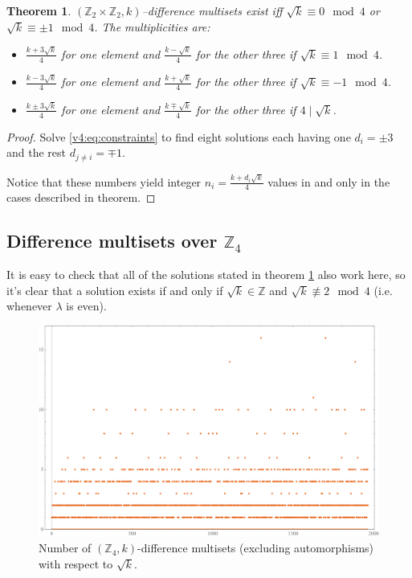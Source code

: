 \documentclass{article}
\theoremstyle{plain}
\newtheorem{theorem}{Theorem}[section]
\theoremstyle{definition}
\theoremstyle{remark}
\begin{document}
            \begin{theorem}
                \label{v4:theorem:z2z2}
                $(\mathbb Z_2 \times \mathbb Z_2, k)$--difference multisets exist iff $\sqrt k \equiv 0 \mod 4$ or $\sqrt k \equiv \pm 1 \mod 4$. The multiplicities are:
                \begin{itemize}
                    \item $\frac{k + 3 \sqrt k}{4}$ for one element and $\frac{k - \sqrt k}{4}$ for the other three if $\sqrt k \equiv 1 \mod 4$.
                    \item $\frac{k - 3 \sqrt k}{4}$ for one element and $\frac{k + \sqrt k}{4}$ for the other three if $\sqrt k \equiv -1 \mod 4$.
                    \item $\frac{k \pm 3 \sqrt k}{4}$ for one element and $\frac{k \mp \sqrt k}{4}$ for the other three if $4 \mid \sqrt k$.
                \end{itemize}
            \end{theorem}
            
            \begin{proof}
                Solve \eqref{v4:eq:constraints} to find eight solutions each having one $d_i = \pm 3$ and the rest $d_{j \neq i} = \mp 1$.
                
                Notice that these numbers yield integer $n_i = \frac{k+d_i \sqrt k}4$ values in and only in the cases described in theorem.
            \end{proof}
	
		\subsection{Difference multisets over $\mathbb Z_4$}
			It is easy to check that all of the solutions stated in theorem \ref{v4:theorem:z2z2} also work here, so it's clear that a solution exists if and only if $\sqrt k \in \mathbb Z$ and $\sqrt k \not\equiv 2 \mod 4$ (i.e. whenever $\lambda$ is even).
			
			\begin{figure}
				\includegraphics[width=\textwidth]{z4}
				\caption{Number of $(\mathbb Z_4, k)$-difference multisets (excluding automorphisms) with respect to $\sqrt k$.}
				\label{other:z4:figure:results}
			\end{figure}
			
\end{document}
